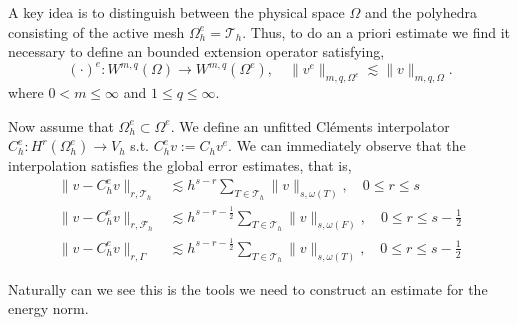 A key idea is to distinguish between the physical space $\Omega $ and the polyhedra consisting of the active mesh $\Omega ^{e}_{h} = \mathcal{T}_{h}$. Thus, to do an
a priori estimate we find it necessary to define an bounded extension operator satisfying, \[
( \cdot ) ^{e}: W^{m,q}( \Omega )  \to W^{m,q} ( \Omega ^{e}), \quad \| v^{e} \|_{ m,q,\Omega ^{e}  }^{  } \lesssim \| v \|_{ m,q, \Omega  }^{  }.
\]
where $0< m \le \infty$ and $1 \le q \le \infty$.

Now assume that $\Omega _{h}^{e} \subset  \Omega^{e} $. We define an unfitted Cléments interpolator $C_{h}^{e}: H^{r}( \Omega ^{e}_{h}) \to V_{h}$
s.t.  $C ^{e} _{h} v := C _{h} v^{e} $.
We can immediately observe that the interpolation satisfies the global error estimates, that is,
\begin{align}
    \label{eq:bi_projection_estimates_1}
    \| v - C _{h}^{e} v \|_{  r, \mathcal{T} _{h} }^{  } & \lesssim h^{s-r}\sum_{T \in \mathcal{T}_h} \| v \|_{ s, \omega(T) }^{  }, \quad 0\le r\le s \\
    \label{eq:bi_projection_estimates_2}
\| v - C ^{e}_{h}v \|_{ r,\mathcal{F} _{h} }^{  } & \lesssim h^{s-r-\frac{1}{2}}\sum_{T \in \mathcal{T}_h} \| v \|_{ s, \omega(F)  }^{  }, \quad 0  \le  r \le   s- \frac{1}{2} \\
    \label{eq:bi_projection_estimates_3}
\| v - C ^{e}_{h}v \|_{ r, \Gamma }^{  } & \lesssim h^{s-r-\frac{1}{2}} \sum_{T \in \mathcal{T}_h}  \| v \|_{ s,  \omega(T)  }^{  }, \quad 0  \le  r \le   s- \frac{1}{2}
\end{align}

Naturally can we see this is the tools we need to construct an estimate for the energy norm.

